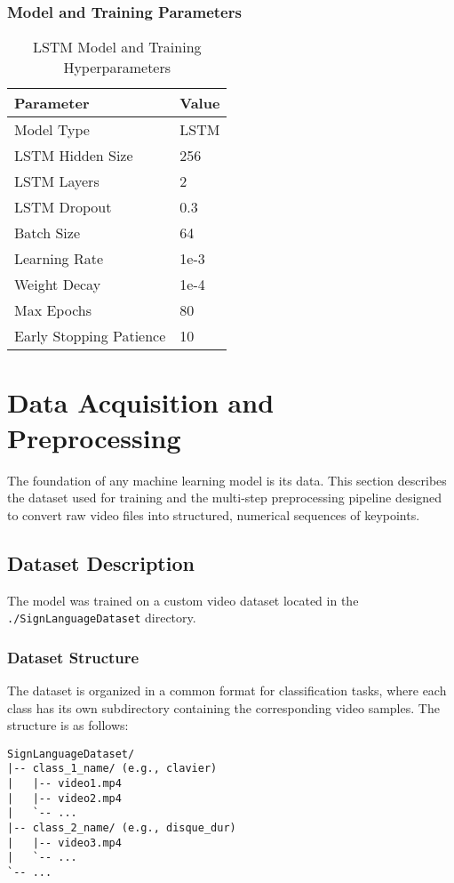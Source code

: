 \documentclass[11pt, a4paper]{article}
\begin{document}
\subsubsection{Model and Training Parameters}
\begin{table}[H]
    \centering
    \caption{LSTM Model and Training Hyperparameters}
    \label{tab:training_params}
    \begin{tabular}{@{}ll@{}}
        \toprule
        \textbf{Parameter} & \textbf{Value} \\ \midrule
        Model Type & LSTM \\
        LSTM Hidden Size & 256 \\
        LSTM Layers & 2 \\
        LSTM Dropout & 0.3 \\
        Batch Size & 64 \\
        Learning Rate & 1e-3 \\
        Weight Decay & 1e-4 \\
        Max Epochs & 80 \\
        Early Stopping Patience & 10 \\ \bottomrule
    \end{tabular}
\end{table}



\section{Data Acquisition and Preprocessing}
The foundation of any machine learning model is its data. This section describes the dataset used for training and the multi-step preprocessing pipeline designed to convert raw video files into structured, numerical sequences of keypoints.

\subsection{Dataset Description}
The model was trained on a custom video dataset located in the \texttt{./SignLanguageDataset} directory.

\subsubsection{Dataset Structure}
The dataset is organized in a common format for classification tasks, where each class has its own subdirectory containing the corresponding video samples. The structure is as follows:
\begin{verbatim}
SignLanguageDataset/
|-- class_1_name/ (e.g., clavier)
|   |-- video1.mp4
|   |-- video2.mp4
|   `-- ...
|-- class_2_name/ (e.g., disque_dur)
|   |-- video3.mp4
|   `-- ...
`-- ...
\end{verbatim}
\end{document}
